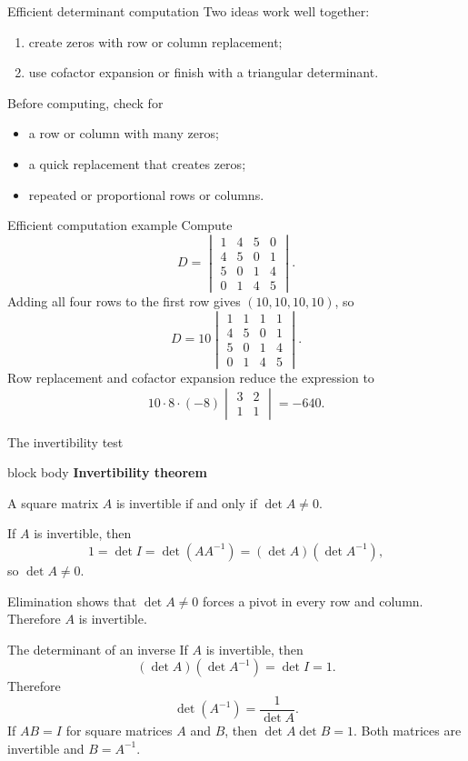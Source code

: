 \documentclass[aspectratio=169]{beamer}
\newcommand{\theorembox}[2]{%
  \begin{beamercolorbox}[sep=1.1ex,wd=\linewidth]{block body}
    \textbf{#1}\par #2
  \end{beamercolorbox}}
\begin{document}
\begin{frame}{Efficient determinant computation}
Two ideas work well together:
\begin{enumerate}
  \item create zeros with row or column replacement;
  \item use cofactor expansion or finish with a triangular determinant.
\end{enumerate}
\pause
Before computing, check for
\begin{itemize}
  \item a row or column with many zeros;
  \item a quick replacement that creates zeros;
  \item repeated or proportional rows or columns.
\end{itemize}
\end{frame}

\begin{frame}{Efficient computation example}
\small
Compute
\[
D=\begin{vmatrix}
1&4&5&0\\4&5&0&1\\5&0&1&4\\0&1&4&5
\end{vmatrix}.
\]
Adding all four rows to the first row gives $(10,10,10,10)$, so
\[
D=10\begin{vmatrix}
1&1&1&1\\4&5&0&1\\5&0&1&4\\0&1&4&5
\end{vmatrix}.
\]
Row replacement and cofactor expansion reduce the expression to
\[
10\cdot8\cdot(-8)\begin{vmatrix}3&2\\1&1\end{vmatrix}
=\boxed{-640}.
\]
\end{frame}

\begin{frame}{The invertibility test}
\theorembox{Invertibility theorem}{A square matrix $A$ is invertible if and only if $\det A\ne0$.}
\medskip
If $A$ is invertible, then
\[
1=\det I=\det(AA^{-1})=(\det A)(\det A^{-1}),
\]
so $\det A\ne0$.
\pause

Elimination shows that $\det A\ne0$ forces a pivot in every row and column. Therefore $A$ is invertible.
\end{frame}

\begin{frame}{The determinant of an inverse}
If $A$ is invertible, then
\[
(\det A)(\det A^{-1})=\det I=1.
\]
Therefore
\[
\boxed{\det(A^{-1})=\frac{1}{\det A}}.
\]
\pause
If $AB=I$ for square matrices $A$ and $B$, then $\det A\det B=1$. Both matrices are invertible and $B=A^{-1}$.
\end{frame}
\end{document}
